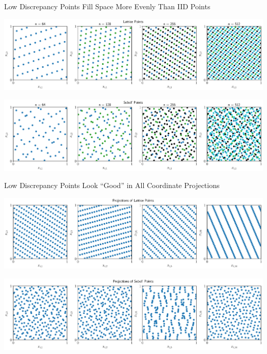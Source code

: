 \documentclass[10pt,compress,xcolor={usenames,dvipsnames},aspectratio=169]{beamer}
\begin{document}
\begin{frame}{Low Discrepancy Points Fill Space More Evenly Than IID Points}
\vspace{-3.2ex}

\includegraphics[width=\textwidth]{latticeptsseq.eps}

\vspace{-4.3ex}

\includegraphics[width=\textwidth]{sobolptsseq.eps}

\end{frame}

\begin{frame}{Low Discrepancy Points Look ``Good'' in All Coordinate Projections}
	\vspace{-3.2ex}

	\includegraphics[width=\textwidth]{latticeptsproj.eps}

	\vspace{-4.3ex}

	\includegraphics[width=\textwidth]{sobolptsproj.eps}


\end{frame}
\end{document}
